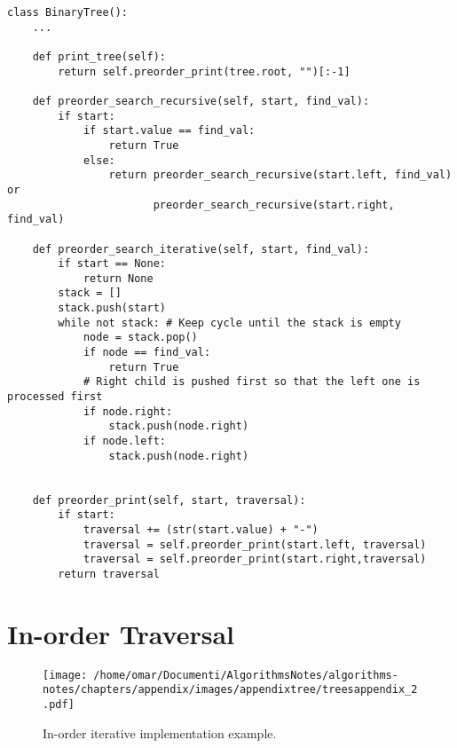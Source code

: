\begin{lstlisting}[firstnumber=1, caption={Tree operations implementation.}]
class BinaryTree():
	...
	
	def print_tree(self):
		return self.preorder_print(tree.root, "")[:-1]
	
	def preorder_search_recursive(self, start, find_val):
		if start:
			if start.value == find_val:
				return True
			else:
				return preorder_search_recursive(start.left, find_val) or
					   preorder_search_recursive(start.right, find_val)
	
	def preorder_search_iterative(self, start, find_val):
		if start == None:
			return None
		stack = []
		stack.push(start)
		while not stack: # Keep cycle until the stack is empty
			node = stack.pop()
			if node == find_val:
				return True
			# Right child is pushed first so that the left one is processed first
			if node.right:
				stack.push(node.right)
			if node.left:
				stack.push(node.right)
		
		
	def preorder_print(self, start, traversal):
		if start:
			traversal += (str(start.value) + "-")
			traversal = self.preorder_print(start.left, traversal)
			traversal = self.preorder_print(start.right,traversal)
		return traversal
\end{lstlisting}

\section{In-order Traversal}
\label{inorderappendix}
\begin{figure}[H]
	\begin{center}
		\texttt{[image: /home/omar/Documenti/AlgorithmsNotes/algorithms-notes/chapters/appendix/images/appendixtree/treesappendix\_2.pdf]}
		\caption[In-order iterative implementation example.]{In-order iterative implementation example.}
		\label{appendixtrees_2}
	\end{center}
\end{figure}

